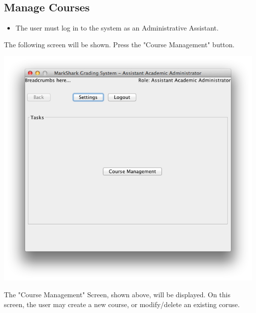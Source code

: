 \documentclass{article}
\begin{document}
\subsection{Manage Courses}
\begin{itemize}
	\item The user must log in to the system as an Administrative Assistant.
\end{itemize}
The following screen will be shown. Press the "Course Management" button.
   \begin{center}
     \includegraphics[scale=0.55]{../images/UpdatedUIScreens/landingassist.png}
   \end{center}
The "Course Management" Screen, shown above, will be displayed. On this screen, the user may  create a new course, or modify/delete an existing coruse.
\clearpage
\end{document}

